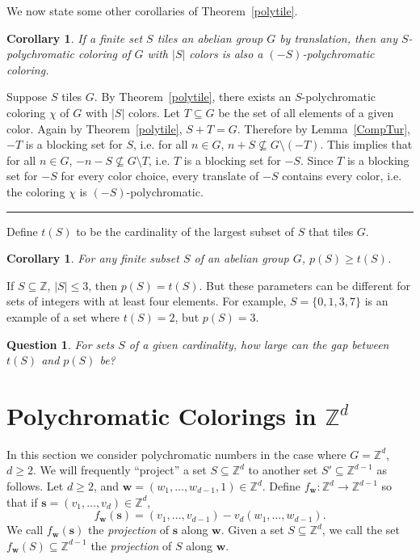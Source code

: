 \documentclass[12pt]{article}
\newenvironment{proof}{{\bf Proof:  }}{\hfill\rule{2mm}{2mm}}
\newtheorem{corollary}[theorem]{Corollary}
\newtheorem{question}[theorem]{Question}
\newcommand{\Z}{\ensuremath{\mathbb Z}}
\newcommand{\vect}[1]{\bm{#1}}
\begin{document}
We now state some other corollaries of Theorem~\ref{polytile}.

\begin{corollary}
If a finite set $S$ tiles an abelian group $G$ by translation, then any $S$-polychromatic coloring of $G$ with $|S|$ colors is also a $(-S)$-polychromatic coloring.
\end{corollary}

\begin{proof}
Suppose $S$ tiles $G$.  By Theorem~\ref{polytile}, there exists an $S$-polychromatic coloring $\chi$ of $G$ with $|S|$ colors.  Let $T \subseteq G$ be the set of all elements of a given color. Again by Theorem~\ref{polytile}, $S + T = G$. Therefore by Lemma~\ref{CompTur}, $-T$ is a blocking set for $S$, i.e. for all $n \in G$, $n+S \nsubseteq G\setminus (-T)$. This implies that for all $n \in G$, $-n-S \nsubseteq G\setminus T$, i.e. $T$ is a blocking set for $-S$.  Since $T$ is a blocking set for $-S$ for every color choice, every translate of $-S$ contains every color, i.e. the coloring $\chi$ is $(-S)$-polychromatic.
\end{proof}


Define $t(S)$ to be the cardinality of the largest subset of $S$ that tiles $G$. 

\begin{corollary}
For any finite subset $S$ of an abelian group $G$, $p(S) \ge t(S)$.
\end{corollary}

If $S\subseteq \Z$, $|S|\le 3$, then $p(S)=t(S)$. But these parameters can be different for sets of integers with at least four elements.  For example, $S=\{0,1,3,7\}$ is an example of a set where $t(S)=2$, but $p(S)=3$.

\begin{question}
For sets $S$ of a given cardinality, how large can the gap between $t(S)$ and $p(S)$ be?
\end{question}



\section{Polychromatic Colorings in $\Z^d$}\label{z2}


In this section we consider polychromatic numbers in the case where $G=\Z^d$, $d\ge 2$. We will frequently ``project'' a set $S \subseteq \Z^d$ to another set $S'\subseteq \Z^{d-1}$ as follows. Let $d \ge 2$, and $\vect{w}=(w_1,\ldots, w_{d-1},1) \in \Z^d$. Define $f_{\vect{w}}: \Z^d \rightarrow \Z^{d-1}$ so that if $\vect{s}=(v_1, \ldots, v_d) \in \Z^d$, 
\[f_{\vect{w}}(\vect{s})= (v_1, \ldots, v_{d-1}) - v_d (w_1,\ldots, w_{d-1}).\]
We call $f_{\vect{w}}(\vect{s})$ the \textit{projection} of $\vect{s}$ along $\vect{w}$. Given a set $S \subseteq \Z^d$, we call the set $f_{\vect{w}}(S) \subseteq \Z^{d-1}$ the \textit{projection} of $S$ along $\vect{w}$.
\end{document}

